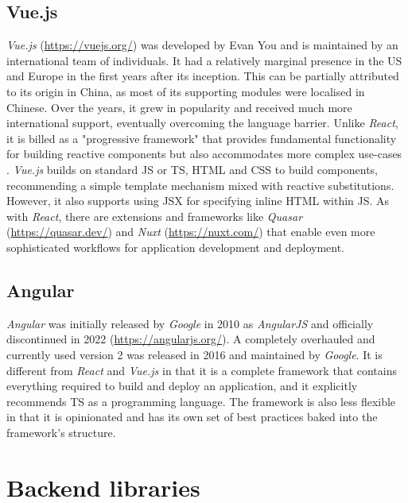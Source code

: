 \subsection{Vue.js}

\emph{Vue.js} (\url{https://vuejs.org/}) was developed by Evan You and is maintained by an international team of individuals. It had a relatively marginal presence in the US and Europe in the first years after its inception. This can be partially attributed to its origin in China, as most of its supporting modules were localised in Chinese. Over the years, it grew in popularity and received much more international support, eventually overcoming the language barrier. Unlike \emph{React}, it is billed as a "progressive framework" that provides fundamental functionality for building reactive components but also accommodates more complex use-cases \parencite{vueProgressiveFramework}. \emph{Vue.js} builds on standard \ac{JS} or \ac{TS}, \ac{HTML} and \ac{CSS} to build components, recommending a simple template mechanism mixed with reactive substitutions. However, it also supports using \ac{JSX} for specifying inline \ac{HTML} within \ac{JS}. As with \emph{React}, there are extensions and frameworks like \emph{Quasar} (\url{https://quasar.dev/}) and \emph{Nuxt} (\url{https://nuxt.com/}) that enable even more sophisticated workflows for application development and deployment.

\subsection{Angular}

\emph{Angular} was initially released by \emph{Google} in 2010 as \emph{AngularJS}  and officially discontinued in 2022 (\url{https://angularjs.org/}). A completely overhauled and currently used version 2 was released in 2016 and maintained by \emph{Google}. It is different from \emph{React} and \emph{Vue.js} in that it is a complete framework that contains everything required to build and deploy an application, and it explicitly recommends \ac{TS} as a programming language. The framework is also less flexible in that it is opinionated and has its own set of best practices baked into the framework's structure.




\section{Backend libraries}

